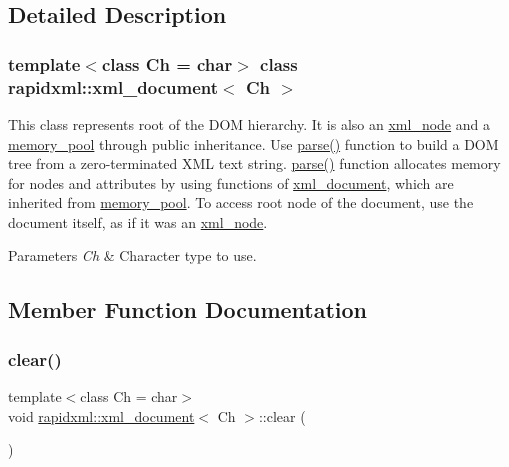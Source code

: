 \subsection{Detailed Description}
\subsubsection*{template$<$class Ch = char$>$\newline
class rapidxml\+::xml\+\_\+document$<$ Ch $>$}

This class represents root of the D\+OM hierarchy. It is also an \hyperlink{classrapidxml_1_1xml__node}{xml\+\_\+node} and a \hyperlink{classrapidxml_1_1memory__pool}{memory\+\_\+pool} through public inheritance. Use \hyperlink{classrapidxml_1_1xml__document_ac6e73ff9ac323bf5a370c38feb03a6b1}{parse()} function to build a D\+OM tree from a zero-\/terminated X\+ML text string. \hyperlink{classrapidxml_1_1xml__document_ac6e73ff9ac323bf5a370c38feb03a6b1}{parse()} function allocates memory for nodes and attributes by using functions of \hyperlink{classrapidxml_1_1xml__document}{xml\+\_\+document}, which are inherited from \hyperlink{classrapidxml_1_1memory__pool}{memory\+\_\+pool}. To access root node of the document, use the document itself, as if it was an \hyperlink{classrapidxml_1_1xml__node}{xml\+\_\+node}. 
\begin{DoxyParams}{Parameters}
{\em Ch} & Character type to use. \\
\hline
\end{DoxyParams}


\subsection{Member Function Documentation}
\mbox{\label{classrapidxml_1_1xml__document_a826929ff54242532198701f19ff5f83f}} 
\subsubsection{\texorpdfstring{clear()}{clear()}}
{\footnotesize\ttfamily template$<$class Ch  = char$>$ \\
void \hyperlink{classrapidxml_1_1xml__document}{rapidxml\+::xml\+\_\+document}$<$ Ch $>$\+::clear (\begin{DoxyParamCaption}{ }\end{DoxyParamCaption})\hspace{0.3cm}{\ttfamily [inline]}}

